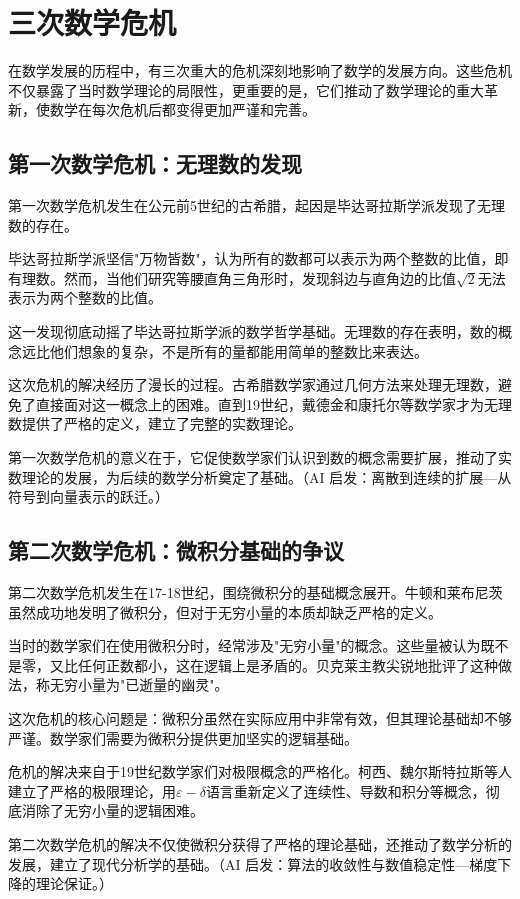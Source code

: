 \section{三次数学危机}
在数学发展的历程中，有三次重大的危机深刻地影响了数学的发展方向。这些危机不仅暴露了当时数学理论的局限性，更重要的是，它们推动了数学理论的重大革新，使数学在每次危机后都变得更加严谨和完善。

\subsection{第一次数学危机：无理数的发现}
第一次数学危机发生在公元前5世纪的古希腊，起因是毕达哥拉斯学派发现了无理数的存在。

毕达哥拉斯学派坚信"万物皆数"，认为所有的数都可以表示为两个整数的比值，即有理数。然而，当他们研究等腰直角三角形时，发现斜边与直角边的比值$\sqrt{2}$无法表示为两个整数的比值。

这一发现彻底动摇了毕达哥拉斯学派的数学哲学基础。无理数的存在表明，数的概念远比他们想象的复杂，不是所有的量都能用简单的整数比来表达。

这次危机的解决经历了漫长的过程。古希腊数学家通过几何方法来处理无理数，避免了直接面对这一概念上的困难。直到19世纪，戴德金和康托尔等数学家才为无理数提供了严格的定义，建立了完整的实数理论。

第一次数学危机的意义在于，它促使数学家们认识到数的概念需要扩展，推动了实数理论的发展，为后续的数学分析奠定了基础。{（AI 启发：离散到连续的扩展—从符号到向量表示的跃迁。）}

\subsection{第二次数学危机：微积分基础的争议}
第二次数学危机发生在17-18世纪，围绕微积分的基础概念展开。牛顿和莱布尼茨虽然成功地发明了微积分，但对于无穷小量的本质却缺乏严格的定义。

当时的数学家们在使用微积分时，经常涉及"无穷小量"的概念。这些量被认为既不是零，又比任何正数都小，这在逻辑上是矛盾的。贝克莱主教尖锐地批评了这种做法，称无穷小量为"已逝量的幽灵"。

这次危机的核心问题是：微积分虽然在实际应用中非常有效，但其理论基础却不够严谨。数学家们需要为微积分提供更加坚实的逻辑基础。

危机的解决来自于19世纪数学家们对极限概念的严格化。柯西、魏尔斯特拉斯等人建立了严格的极限理论，用$\varepsilon-\delta$语言重新定义了连续性、导数和积分等概念，彻底消除了无穷小量的逻辑困难。

第二次数学危机的解决不仅使微积分获得了严格的理论基础，还推动了数学分析的发展，建立了现代分析学的基础。{（AI 启发：算法的收敛性与数值稳定性—梯度下降的理论保证。）}

